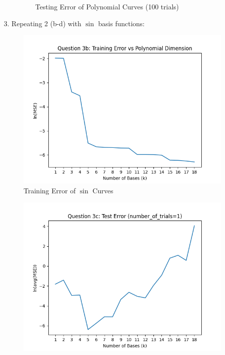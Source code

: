 \documentclass[12pt]{article}
\begin{document}
\begin{enumerate}[leftmargin=\labelsep]
\begin{enumerate}
\begin{figure}[h]
            \caption{Testing Error of Polynomial Curves (100 trials)}
            \label{fig:2d}
            \end{figure}
    \end{enumerate}
\newpage
\item[3.] Repeating 2 (b-d) with $\sin$ basis functions:
            \begin{figure}[h]
            \centering
            \includegraphics[scale=0.5]{outputs/q3/q3b}
            \caption{Training Error of $\sin$ Curves}
            \label{fig:3b}
            \end{figure}
            \begin{figure}[h]
            \centering
            \includegraphics[scale=0.5]{outputs/q3/q3c}

\end{figure}
\end{enumerate}
\end{document}
